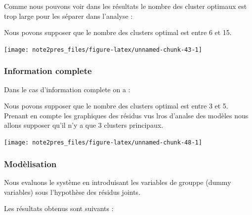 \documentclass[11pt,]{article}
\begin{document}
Comme nous pouvons voir dans les résultats le nombre des cluster
optimaux est trop large pour les séparer dans l'analyse :

Nous povons supposer que le nombre des clusters optimal est entre 6 et
15.

\FloatBarrier

\begin{center}\texttt{[image: note2pres\_files/figure-latex/unnamed-chunk-43-1]} \end{center}

\FloatBarrier

\hypertarget{information-complete}{%
\subsubsection{Information complete}\label{information-complete}}

Dans le cas d'information complete on a :

Nous povons supposer que le nombre des clusters optimal est entre 3 et
5. Prenant en compte les graphiques des résidus vus lros d'analse des
modèles nous allons supposer qu'il n'y a que 3 clusters principaux.

\FloatBarrier

\begin{center}\texttt{[image: note2pres\_files/figure-latex/unnamed-chunk-48-1]} \end{center}

\FloatBarrier

\hypertarget{modelisation-1}{%
\subsubsection{Modèlisation}\label{modelisation-1}}

\FloatBarrier

Nous evaluons le système en introduisant les variables de grouppe (dummy
variables) sous l'hypothèse des résidus joints.

Les résultats obtenus sont suivants :

\FloatBarrier
\end{document}
